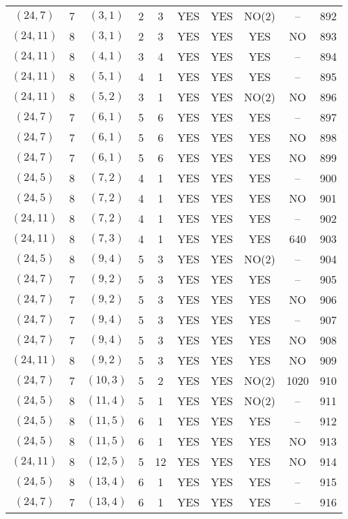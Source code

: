\begin{longtable}{|c|c|c|c|c|c|c|c|c|c|}
$(24, 7)$ & 7 & $(3, 1)$ & 2 & 3 & YES & YES & NO(2) & -- & 892\\
$(24, 11)$ & 8 & $(3, 1)$ & 2 & 3 & YES & YES & YES & NO & 893\\
$(24, 11)$ & 8 & $(4, 1)$ & 3 & 4 & YES & YES & YES & -- & 894\\
$(24, 11)$ & 8 & $(5, 1)$ & 4 & 1 & YES & YES & YES & -- & 895\\
$(24, 11)$ & 8 & $(5, 2)$ & 3 & 1 & YES & YES & NO(2) & NO & 896\\
$(24, 7)$ & 7 & $(6, 1)$ & 5 & 6 & YES & YES & YES & -- & 897\\
$(24, 7)$ & 7 & $(6, 1)$ & 5 & 6 & YES & YES & YES & NO & 898\\
$(24, 7)$ & 7 & $(6, 1)$ & 5 & 6 & YES & YES & YES & NO & 899\\
$(24, 5)$ & 8 & $(7, 2)$ & 4 & 1 & YES & YES & YES & -- & 900\\
$(24, 5)$ & 8 & $(7, 2)$ & 4 & 1 & YES & YES & YES & NO & 901\\
$(24, 11)$ & 8 & $(7, 2)$ & 4 & 1 & YES & YES & YES & -- & 902\\
$(24, 11)$ & 8 & $(7, 3)$ & 4 & 1 & YES & YES & YES & 640 & 903\\
$(24, 5)$ & 8 & $(9, 4)$ & 5 & 3 & YES & YES & NO(2) & -- & 904\\
$(24, 7)$ & 7 & $(9, 2)$ & 5 & 3 & YES & YES & YES & -- & 905\\
$(24, 7)$ & 7 & $(9, 2)$ & 5 & 3 & YES & YES & YES & NO & 906\\
$(24, 7)$ & 7 & $(9, 4)$ & 5 & 3 & YES & YES & YES & -- & 907\\
$(24, 7)$ & 7 & $(9, 4)$ & 5 & 3 & YES & YES & YES & NO & 908\\
$(24, 11)$ & 8 & $(9, 2)$ & 5 & 3 & YES & YES & YES & NO & 909\\
$(24, 7)$ & 7 & $(10, 3)$ & 5 & 2 & YES & YES & NO(2) & 1020 & 910\\
$(24, 5)$ & 8 & $(11, 4)$ & 5 & 1 & YES & YES & NO(2) & -- & 911\\
$(24, 5)$ & 8 & $(11, 5)$ & 6 & 1 & YES & YES & YES & -- & 912\\
$(24, 5)$ & 8 & $(11, 5)$ & 6 & 1 & YES & YES & YES & NO & 913\\
$(24, 11)$ & 8 & $(12, 5)$ & 5 & 12 & YES & YES & YES & NO & 914\\
$(24, 5)$ & 8 & $(13, 4)$ & 6 & 1 & YES & YES & YES & -- & 915\\
$(24, 7)$ & 7 & $(13, 4)$ & 6 & 1 & YES & YES & YES & -- & 916\\

\end{longtable}
